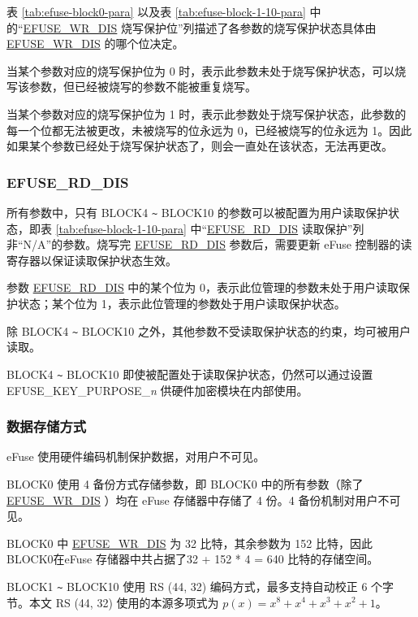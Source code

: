 \documentclass[main\_\_CN.tex]{subfiles}
\begin{document}
表 \ref{tab:efuse-block0-para} 以及表 \ref{tab:efuse-block-1-10-para} 中的“\hyperref[fielddesc:EFUSEWRDIS]{EFUSE\_WR\_DIS} 烧写保护位”列描述了各参数的烧写保护状态具体由 \hyperref[fielddesc:EFUSEWRDIS]{EFUSE\_WR\_DIS} 的哪个位决定。

当某个参数对应的烧写保护位为 0 时，表示此参数未处于烧写保护状态，可以烧写该参数，但已经被烧写的参数不能被重复烧写。

当某个参数对应的烧写保护位为 1 时，表示此参数处于烧写保护状态，此参数的每一个位都无法被更改，未被烧写的位永远为 0，已经被烧写的位永远为 1。因此如果某个参数已经处于烧写保护状态了，则会一直处在该状态，无法再更改。

\subsubsection{EFUSE\_RD\_DIS}
\label{sec:efuse-rd-dis}

所有参数中，只有 BLOCK4 \verb+~+ BLOCK10 的参数可以被配置为用户读取保护状态，即表 \ref{tab:efuse-block-1-10-para} 中“\hyperref[fielddesc:EFUSERDDIS]{EFUSE\_RD\_DIS} 读取保护”列非“N/A”的参数。烧写完 \hyperref[fielddesc:EFUSERDDIS]{EFUSE\_RD\_DIS} 参数后，需要更新 eFuse 控制器的读寄存器以保证读取保护状态生效。

参数 \hyperref[fielddesc:EFUSERDDIS]{EFUSE\_RD\_DIS} 中的某个位为 0，表示此位管理的参数未处于用户读取保护状态；某个位为 1，表示此位管理的参数处于用户读取保护状态。

除 BLOCK4 \verb+~+ BLOCK10 之外，其他参数不受读取保护状态的约束，均可被用户读取。

BLOCK4 \verb+~+ BLOCK10 即使被配置处于读取保护状态，仍然可以通过设置 EFUSE\_KEY\_PURPOSE\_\textcolor{myred}{\it{n}} 供硬件加密模块在内部使用。

\subsubsection{数据存储方式}
\label{sec:efuse-data-storage}

eFuse 使用硬件编码机制保护数据，对用户不可见。

BLOCK0 使用 4 备份方式存储参数，即 BLOCK0 中的所有参数（除了 \hyperref[fielddesc:EFUSEWRDIS]{EFUSE\_WR\_DIS} ）均在 eFuse 存储器中存储了 4 份。4 备份机制对用户不可见。

BLOCK0 中 \hyperref[fielddesc:EFUSEWRDIS]{EFUSE\_WR\_DIS} 为 32 比特，其余参数为 152 比特，因此BLOCK0在eFuse 存储器中共占据了32 + 152 * 4 = 640 比特的存储空间。

BLOCK1 \verb+~+ BLOCK10 使用 RS (44, 32) 编码方式，最多支持自动校正 6 个字节。本文 RS (44, 32) 使用的本源多项式为 \(p(x)=x^8+x^4+x^3+x^2+1\)。
\end{document}
